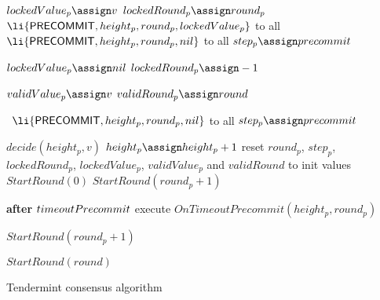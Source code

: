 \begin{algorithm}[htb!]
\begin{algorithmic}[1]
\SPACE
{} \label{line:tab:recvPrevote}
  \STATE $lockedValue_p \assign v$   \label{line:tab:setLockedValue}
  \STATE $lockedRound_p \assign round_p$   \label{line:tab:setLockedRound} 
   \STATE \PBroadcast \ $\li{\Precommit,height_p,round_p,lockedValue_p}$ to all \label{line:tab:send-precommit}
 \ELSE 
   \STATE \PBroadcast \ $\li{\Precommit,height_p,round_p,\nil}$ to all \label{line:tab:send-precommit-nil}	
 \ENDIF
 \STATE $step_p \assign \precommit$ \label{line:tab:setStateToCommit}
\ENDUPON

\SPACE
{}  \label{line:tab:unlockRule}
\IF{$v \neq lockedValue_p$}	
	\STATE $lockedValue_p \assign \nil$
	\STATE $lockedRound_p \assign -1$	
\ENDIF		
\ENDUPON

\SPACE
{}  \label{line:tab:validValueRule}
	\STATE $validValue_p \assign v$  \label{line:tab:setValidValue}
	\STATE $validRound_p \assign round$  \label{line:tab:setValidRound}
\ENDUPON

\SPACE
{} \label{line:tab:onTimeoutPrevote}
  \STATE \PBroadcast \ $\li{\Precommit,height_p,round_p,\nil}$ to all  \label{line:tab:precommit-nil-onTimeout}
  \STATE $step_p \assign \precommit$  
\ENDIF	
\ENDFUNCTION

\SPACE
{} \label{line:tab:onPrecommitRule}
	   \STATE $decide(height_p, v)$ \label{line:tab:decide}
	   \STATE$height_p \assign height_p + 1$
	   \STATE reset $round_p$, $step_p$, $lockedRound_p$, $lockedValue_p$, $validValue_p$ and $validRound$ to init values    
	   \STATE $StartRound(0)$
  \ENDIF
  \IF{$round_p = round$}
    \STATE $StartRound(round_p+1)$
  \ENDIF  	
\ENDUPON
 
\SPACE
{} \label{line:tab:startTimeoutPrecommit}
	\STATE \textbf{after} $timeoutPrecommit$ execute $OnTimeoutPrecommit(height_p, round_p)$
\ENDUPON 

\SPACE
{} \label{line:tab:onTimeoutPrecommit}
\STATE $StartRound(round_p+1)$
\ENDIF	
\ENDFUNCTION

\SPACE
{} \label{line:tab:skipRounds}
  \STATE $StartRound(round)$
\ENDUPON

\end{algorithmic}
\caption{Tendermint consensus algorithm}
\label{alg:tendermint}
\end{algorithm}


